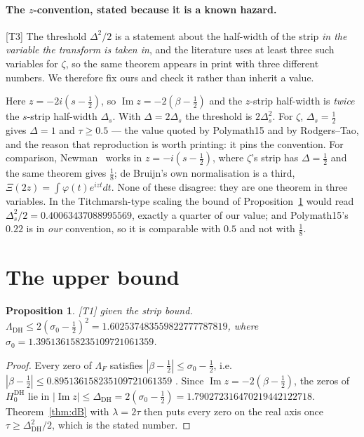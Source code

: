 \documentclass[11pt,a4paper]{article}
\newtheorem{proposition}[theorem]{Proposition}
\theoremstyle{remark}
\newcommand{\tier}[1]{{\small\textsf{[#1]}}}
\newcommand{\LamDH}{\Lambda_{\mathrm{DH}}}
\newcommand{\HDH}{H^{\mathrm{DH}}}
\begin{document}
\paragraph{The $z$-convention, stated because it is a known hazard.}
\tier{T3} The threshold $\Delta^2/2$ is a statement about the half-width of the strip
\emph{in the variable the transform is taken in}, and the literature uses at least three
such variables for $\zeta$, so the same theorem appears in print with three different
numbers. We therefore fix ours and check it rather than inherit a value.

Here $z=-2i(s-\tfrac12)$, so $\operatorname{Im}z=-2(\beta-\tfrac12)$ and the $z$-strip
half-width is \emph{twice} the $s$-strip half-width $\Delta_s$. With
$\Delta=2\Delta_s$ the threshold is $2\Delta_s^2$. For $\zeta$, $\Delta_s=\tfrac12$ gives
$\Delta=1$ and $\tau\ge0.5$ --- the value quoted by Polymath15 and by Rodgers--Tao, and the
reason that reproduction is worth printing: it pins the convention. For comparison,
Newman~\cite[p.~246]{Ne76} works in $z=-i(s-\tfrac12)$, where $\zeta$'s strip has
$\Delta=\tfrac{1}{2}$ and the same theorem gives $\tfrac{1}{8}$; de Bruijn's own normalisation
is a third, $\Xi(2z)=\int\varphi(t)e^{izt}dt$. None of these disagree: they are one theorem
in three variables. In the Titchmarsh-type scaling the bound of
Proposition~\ref{prop:upper} would read $\Delta_s^2/2=0.40063437088995569$, exactly a
quarter of our value; and Polymath15's $0.22$ is in \emph{our} convention, so it is
comparable with $0.5$ and not with $\tfrac{1}{8}$.

\section{The upper bound}\label{sec:upper}

\begin{proposition}\label{prop:upper}
\tier{T1} \emph{given} the strip bound.
$\LamDH\le2(\sigma_0-\tfrac12)^2=1.602537483559822777787819$, where
$\sigma_0=1.395136158235109721061359$.
\end{proposition}

\begin{proof}
Every zero of $\Lambda_F$ satisfies $|\beta-\tfrac12|\le\sigma_0-\tfrac12$, i.e.
$|\beta-\tfrac12|\le0.895136158235109721061359$ \cite[\S3]{dhnote}. Since
$\operatorname{Im}z=-2(\beta-\tfrac12)$, the zeros of $\HDH_0$ lie in
$|\operatorname{Im}z|\le\Delta_{\mathrm{DH}}=2(\sigma_0-\tfrac12)
=1.790272316470219442122718$. Theorem~\ref{thm:dB} with $\lambda=2\tau$ then puts every
zero on the real axis once $\tau\ge\Delta_{\mathrm{DH}}^2/2$, which is the stated number.
\end{proof}
\end{document}
